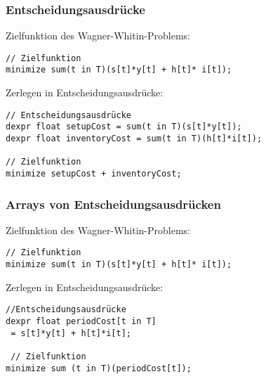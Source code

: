 \begin{frame}[fragile]
 \frametitle{Entscheidungsausdrücke}
 Zielfunktion des Wagner-Whitin-Problems:
\begin{lstlisting}[numbers=none,basicstyle=\scriptsize\ttfamily]
// Zielfunktion
minimize sum(t in T)(s[t]*y[t] + h[t]* i[t]);
\end{lstlisting}

Zerlegen in Entscheidungsausdrücke:
\begin{lstlisting}[numbers=none,basicstyle=\scriptsize\ttfamily]
// Entscheidungsausdrücke
dexpr float setupCost = sum(t in T)(s[t]*y[t]);
dexpr float inventoryCost = sum(t in T)(h[t]*i[t]);

// Zielfunktion
minimize setupCost + inventoryCost;
\end{lstlisting}
\end{frame}

\begin{frame}[fragile]
 \frametitle{Arrays von Entscheidungsausdrücken}
 Zielfunktion des Wagner-Whitin-Problems:
\begin{lstlisting}[numbers=none,basicstyle=\scriptsize\ttfamily]
// Zielfunktion
minimize sum(t in T)(s[t]*y[t] + h[t]* i[t]);
\end{lstlisting}

Zerlegen in Entscheidungsausdrücke:
\begin{lstlisting}[numbers=none,basicstyle=\scriptsize\ttfamily]
//Entscheidungsausdrücke
dexpr float periodCost[t in T] 
 = s[t]*y[t] + h[t]*i[t];

 // Zielfunktion
minimize sum (t in T)(periodCost[t]);
\end{lstlisting}
\end{frame}

